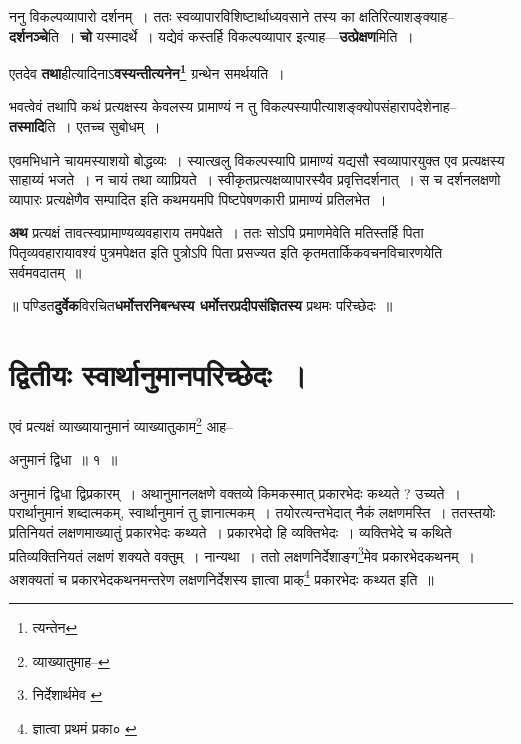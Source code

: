 \documentclass[article,12pt,a4paper]{memoir}
\begin{document}
	  \pstart ननु विकल्पव्यापारो दर्शनम् । ततः स्वव्यापारविशिष्टार्थाध्यवसाने तस्य का क्षतिरित्याशङ्क्याह--\textbf{दर्शनञ्चे}ति । \textbf{चो} यस्मादर्थे । यद्येवं कस्तर्हि विकल्पव्यापार इत्याह—\textbf{उत्प्रेक्षण}मिति ।
	\pend
      

	  \pstart एतदेव \textbf{तथा}हीत्यादिनाऽ\textbf{वस्यन्तीत्यनेन\footnote{त्यन्तेन}} ग्रन्थेन समर्थयति ।
	\pend
      

	  \pstart भवत्वेवं तथापि कथं प्रत्यक्षस्य केवलस्य प्रामाण्यं न तु विकल्पस्यापीत्याशङ्क्योपसंहारापदेशेनाह--\textbf{तस्मादि}ति । एतच्च सुबोधम् ।
	\pend
      

	  \pstart एवमभिधाने चायमस्याशयो बोद्धव्यः । स्यात्खलु विकल्पस्यापि प्रामाण्यं यद्यसौ स्वव्यापारयुक्त एव प्रत्यक्षस्य साहाय्यं भजते । न चायं तथा व्याप्रियते । स्वीकृतप्रत्यक्षव्यापारस्यैव प्रवृत्तिदर्शनात् । स च दर्शनलक्षणो व्यापारः प्रत्यक्षेणैव सम्पादित इति कथमयमपि पिष्टपेषणकारी प्रामाण्यं प्रतिलभेत ।
	\pend
      

	  \pstart \textbf{अथ} प्रत्यक्षं तावत्स्वप्रामाण्यव्यव\leavevmode{}हाराय तमपेक्षते । ततः सोऽपि प्रमाणमेवेति मतिस्तर्हि पिता पितृव्यवहारायावश्यं पुत्रमपेक्षत इति पुत्रोऽपि पिता प्रसज्यत इति कृतमतार्किकवचनविचारणयेति सर्वमवदातम् ॥
	\pend
      

	  \pstart ॥ पण्डित\textbf{दुर्वेक}विरचित\textbf{धर्मोत्तरनिबन्धस्य धर्मोत्तरप्रदीपसंज्ञितस्य} प्रथमः परिच्छेदः ॥
	\pend
      
	    
	    \endnumbering%
	    \endgroup
	    
	  
	  
	
	    
	    \begingroup
	    \beginnumbering%
	    
	  
\chapter[{द्वितीयः स्वार्थानुमानपरिच्छेदः ।}]{द्वितीयः स्वार्थानुमानपरिच्छेदः ।}
	  \bigskip
	  \begingroup
	

	  \pstart एवं प्रत्यक्षं व्याख्यायानुमानं व्याख्यातुकाम\footnote{व्याख्यातुमाह--\cite{dp-msA}} आह--
	\pend
       
	  \bigskip
	  \begingroup
	

	  \pstart अनुमानं द्विधा ॥ १ ॥
	\pend
      
	  \endgroup
	 

	  \pstart अनुमानं द्विधा द्विप्रकारम् । अथानुमानलक्षणे वक्तव्ये किमकस्मात् प्रकारभेदः कथ्यते ? उच्यते । परार्थानुमानं शब्दात्मकम्, स्वार्थानुमानं तु ज्ञानात्मकम् । तयोरत्यन्तभेदात् नैकं लक्षणमस्ति । ततस्तयोः प्रतिनियतं लक्षणमाख्यातुं प्रकारभेदः कथ्यते । प्रकारभेदो हि व्यक्तिभेदः । व्यक्तिभेदे च कथिते प्रतिव्यक्तिनियतं लक्षणं शक्यते वक्तुम् । नान्यथा । ततो लक्षणनिर्देशाङ्ग\footnote{निर्देशार्थमेव \cite{dp-msA} \cite{dp-msC}}\-मेव प्रकारभेदकथनम् । अशक्यतां च प्रकारभेदकथनमन्तरेण लक्षणनिर्देशस्य ज्ञात्वा प्राक्\footnote{ज्ञात्वा प्रथमं प्रका० \cite{dp-msC} \cite{dp-msD}} प्रकारभेदः कथ्यत इति ॥
	\pend
      
\end{document}
